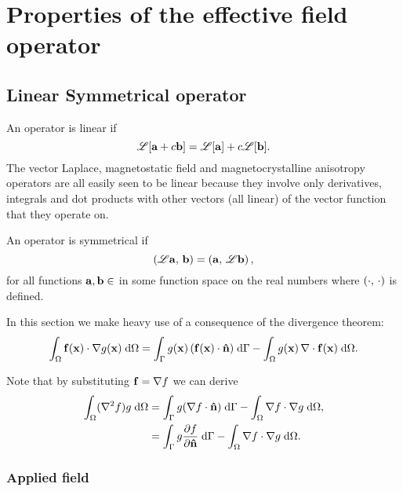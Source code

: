 \newtheorem{theorem}{Theorem}

\newcommand{\ff}{f}
\newcommand{\gf}{g}

\newcommand{\knl}{k}

\section{Properties of the effective field operator}
\label{sec:properties-of-field-operators}

\subsection{Linear Symmetrical operator}
\label{sec:linear-symm-field-operators}

An operator is linear if
\begin{equation}
  \mathscr{L}[{\mathbf{a}} + c{\mathbf{b}}] = \mathscr{L}[{\mathbf{a}}] + c\mathscr{L}[{\mathbf{b}}].
\end{equation}
The vector Laplace, magnetostatic field and magnetocrystalline anisotropy operators are all easily seen to be linear because they involve only derivatives, integrals and dot products with other vectors (all linear) of the vector function that they operate on.

An operator is symmetrical if
\begin{equation}
  \left(\mathscr{L} {\mathbf{a}},\, {\mathbf{b}} \right) = \left({\mathbf{a}},\, \mathscr{L} {\mathbf{b}} \right),
\end{equation}
for all functions ${\mathbf{a}}, {\mathbf{b}} \in $ in some function space on the real numbers where $\left(\cdot,\, \cdot \right)$ is defined.

In this section we make heavy use of a consequence of the divergence theorem:
\begin{equation}
  \intd{\fv(\xv) \cdot \grad \gf(\xv)}
  = \intb{\gf(\xv) \, (\fv(\xv) \cdot \nv)} - \intd{\gf(\xv) \, \div \fv(\xv)}.
  \label{eqn:grad-divergence}
\end{equation}

Note that by substituting $\fv = \grad \ff$ we can derive
\begin{equation}
  \begin{aligned}
    \intd{(\lap \ff) \gf}
    &= \intb{\gf (\nabla \ff \cdot \nv)} - \intd{\nabla \ff \cdot \nabla \gf}, \\
    &= \intb{\gf \ddn{\ff}} - \intd{\nabla \ff \cdot \nabla \gf}.
    \label{eqn:laplace-divergence}
  \end{aligned}
\end{equation}

\subsubsection{Applied field}

